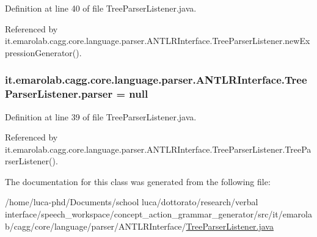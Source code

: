 Definition at line 40 of file Tree\-Parser\-Listener.\-java.



Referenced by it.\-emarolab.\-cagg.\-core.\-language.\-parser.\-A\-N\-T\-L\-R\-Interface.\-Tree\-Parser\-Listener.\-new\-Expression\-Generator().

\hypertarget{classit_1_1emarolab_1_1cagg_1_1core_1_1language_1_1parser_1_1ANTLRInterface_1_1TreeParserListener_a81b2e5e2d506fb0384e95edadf4a844c}{
\subsubsection[{parser}]{ it.\-emarolab.\-cagg.\-core.\-language.\-parser.\-A\-N\-T\-L\-R\-Interface.\-Tree\-Parser\-Listener.\-parser = null\hspace{0.3cm}{\ttfamily [private]}}}\label{classit_1_1emarolab_1_1cagg_1_1core_1_1language_1_1parser_1_1ANTLRInterface_1_1TreeParserListener_a81b2e5e2d506fb0384e95edadf4a844c}


Definition at line 39 of file Tree\-Parser\-Listener.\-java.



Referenced by it.\-emarolab.\-cagg.\-core.\-language.\-parser.\-A\-N\-T\-L\-R\-Interface.\-Tree\-Parser\-Listener.\-Tree\-Parser\-Listener().



The documentation for this class was generated from the following file\-:\begin{DoxyCompactItemize}
\item 
/home/luca-\/phd/\-Documents/school luca/dottorato/research/verbal interface/speech\-\_\-workspace/concept\-\_\-action\-\_\-grammar\-\_\-generator/src/it/emarolab/cagg/core/language/parser/\-A\-N\-T\-L\-R\-Interface/\hyperlink{TreeParserListener_8java}{Tree\-Parser\-Listener.\-java}\end{DoxyCompactItemize}
